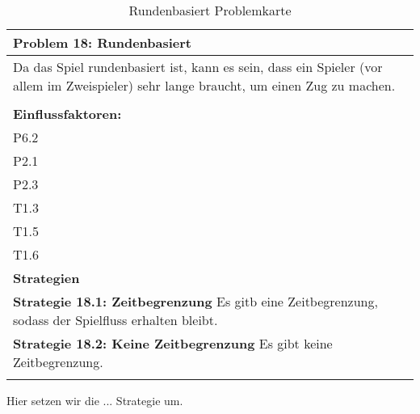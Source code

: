 \documentclass[fontsize=12pt,paper=a4,twoside]{scrartcl}
\begin{document}
\begin{table}[H]
    \centering
    \begin{tabular}{|p{15cm}|}
    \hline
          \textbf{Problem 18: Rundenbasiert}  \\ \hline
	Da das Spiel rundenbasiert ist, kann es sein, dass ein Spieler (vor allem im Zweispieler) sehr lange braucht, um einen Zug zu machen. \\
         \\ \hline
          \textbf{Einflussfaktoren: } \\
	P6.2 \\
	P2.1 \\
	P2.3 \\
	T1.3 \\
	T1.5 \\
	T1.6 \\
          \hline
          \textbf{Strategien} \\ \hline
            {}          
           \label{strategie:18.1}     
          \textbf{Strategie 18.1: Zeitbegrenzung} Es gitb eine Zeitbegrenzung, sodass der Spielfluss erhalten bleibt.   \\        
  {}          
           \label{strategie:18.2}              
          \textbf{Strategie 18.2: Keine Zeitbegrenzung} Es gibt keine Zeitbegrenzung. \\
	 \\ \hline
    \end{tabular}

    \caption{Rundenbasiert Problemkarte}
    \label{tab:ProblemKarte18}
\end{table}
Hier setzen wir die ... Strategie um. \\
\end{document}
